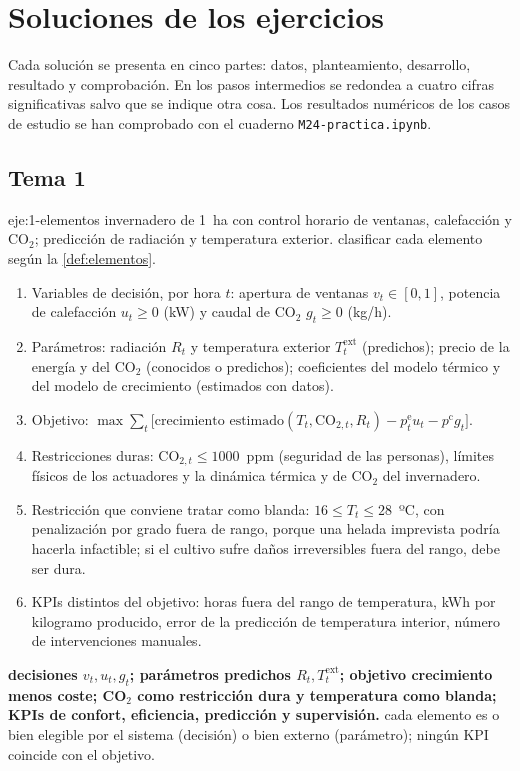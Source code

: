 \chapter{Soluciones de los ejercicios}
\label{ap:soluciones}

Cada solución se presenta en cinco partes: datos, planteamiento, desarrollo, resultado y comprobación. En los pasos intermedios se redondea a cuatro cifras significativas salvo que se indique otra cosa. Los resultados numéricos de los casos de estudio se han comprobado con el cuaderno \texttt{M24-practica.ipynb}.

\section{Tema 1}

\begin{solucion}{eje:1-elementos}
\datos invernadero de 1~ha con control horario de ventanas, calefacción y CO$_2$; predicción de radiación y temperatura exterior.
\planteamiento clasificar cada elemento según la \cref{def:elementos}.
\pasos
\begin{enumerate}[label=\arabic*.]
  \item Variables de decisión, por hora $t$: apertura de ventanas $v_t\in[0,1]$, potencia de calefacción $u_t\ge 0$ (kW) y caudal de CO$_2$ $g_t\ge 0$ (kg/h).
  \item Parámetros: radiación $R_t$ y temperatura exterior $T^{\mathrm{ext}}_t$ (predichos); precio de la energía y del CO$_2$ (conocidos o predichos); coeficientes del modelo térmico y del modelo de crecimiento (estimados con datos).
  \item Objetivo: $\max\sum_t\bigl[\text{crecimiento estimado}(T_t,\mathrm{CO}_{2,t},R_t)-p^{\mathrm{e}}_tu_t-p^{\mathrm{c}}g_t\bigr]$.
  \item Restricciones duras: $\mathrm{CO}_{2,t}\le 1000$~ppm (seguridad de las personas), límites físicos de los actuadores y la dinámica térmica y de CO$_2$ del invernadero.
  \item Restricción que conviene tratar como blanda: $16\le T_t\le 28$~ºC, con penalización por grado fuera de rango, porque una helada imprevista podría hacerla infactible; si el cultivo sufre daños irreversibles fuera del rango, debe ser dura.
  \item KPIs distintos del objetivo: horas fuera del rango de temperatura, kWh por kilogramo producido, error de la predicción de temperatura interior, número de intervenciones manuales.
\end{enumerate}
\resultado \textbf{decisiones $v_t,u_t,g_t$; parámetros predichos $R_t,T^{\mathrm{ext}}_t$; objetivo crecimiento menos coste; CO$_2$ como restricción dura y temperatura como blanda; KPIs de confort, eficiencia, predicción y supervisión.}
\comprobacion cada elemento es o bien elegible por el sistema (decisión) o bien externo (parámetro); ningún KPI coincide con el objetivo.
\end{solucion}

